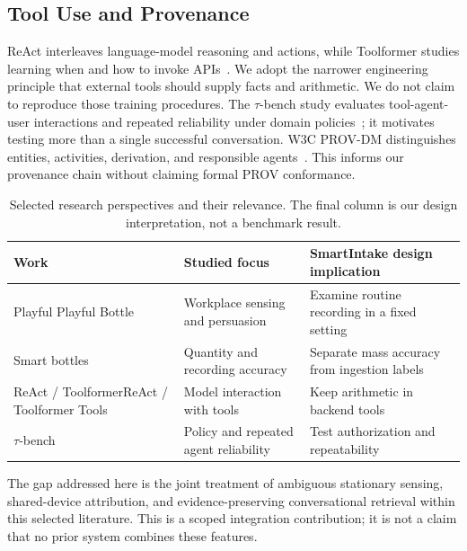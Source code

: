 \documentclass[conference]{IEEEtran}
\providecommand{\DIFadd}[1]{{\protect\color{blue} \sf #1}} %
\providecommand{\DIFdel}[1]{{\protect\color{red} \ifmmode #1\else\scriptsize #1\fi}} %
\providecommand{\DIFaddFL}[1]{\DIFadd{#1}} %
\providecommand{\DIFdelFL}[1]{\DIFdel{#1}} %
\providecommand{\DIFaddbeginFL}{} %
\providecommand{\DIFaddendFL}{} %
\providecommand{\DIFdelbeginFL}{} %
\providecommand{\DIFdelendFL}{} %
\begin{document}
\subsection{Tool Use and Provenance}
ReAct interleaves language-model reasoning and actions, while Toolformer studies learning when and how to invoke APIs~\cite{yao2023react,schick2023}. We adopt the narrower engineering principle that external tools should supply facts and arithmetic. We do not claim to reproduce those training procedures. The $\tau$-bench study evaluates tool-agent-user interactions and repeated reliability under domain policies~\cite{yao2024tau}; it motivates testing more than a single successful conversation. W3C PROV-DM distinguishes entities, activities, derivation, and responsible agents~\cite{prov}. This informs our provenance chain without claiming formal PROV conformance.

\begin{table}[t]
\caption{Selected research perspectives and their relevance. The final column is our design interpretation, not a benchmark result.}\label{tab:related}
\centering\footnotesize\setlength{\tabcolsep}{4pt}
\DIFdelbeginFL %
\DIFdelendFL \DIFaddbeginFL \begin{tabular}{@{}P{.19\columnwidth}P{.31\columnwidth}P{.42\columnwidth}@{}}\DIFaddendFL \toprule
Work & Studied focus & SmartIntake design implication\\\midrule
\DIFdelbeginFL \DIFdelFL{Playful }\DIFdelendFL Bottle~\cite{chiu2009} & Workplace sensing and persuasion & Examine routine recording in a fixed setting\\
Smart bottles~\cite{cohen2022} & Quantity and recording accuracy & Separate mass accuracy from ingestion labels\\
\DIFdelbeginFL \DIFdelFL{ReAct / Toolformer}\DIFdelendFL \DIFaddbeginFL \DIFaddFL{Tools}\DIFaddendFL ~\cite{yao2023react,schick2023} & Model interaction with tools & Keep arithmetic in backend tools\\
$\tau$-bench~\cite{yao2024tau} & Policy and repeated agent reliability & Test authorization and repeatability\\\bottomrule
\end{tabular}
\end{table}

The gap addressed here is the joint treatment of ambiguous stationary sensing, shared-device attribution, and evidence-preserving conversational retrieval within this selected literature. This is a scoped integration contribution; it is not a claim that no prior system combines these features.
\end{document}
